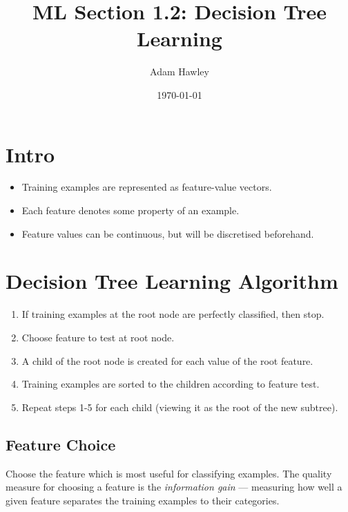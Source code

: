 \documentclass[11pt]{article}
\author{Adam Hawley}
\date{\today}
\title{ML Section 1.2: Decision Tree Learning}
\begin{document}
\maketitle
\tableofcontents


\section{Intro}
\label{sec:orgd5e139f}
\begin{itemize}
\item Training examples are represented as feature-value vectors.
\item Each feature denotes some property of an example.
\item Feature values can be continuous, but will be discretised beforehand.
\end{itemize}

\section{Decision Tree Learning Algorithm}
\label{sec:orgbc003dd}
\begin{enumerate}
\item If training examples at the root node are perfectly classified, then stop.
\item Choose feature to test at root node.
\item A child of the root node is created for each value of the root feature.
\item Training examples are sorted to the children according to feature test.
\item Repeat steps 1-5 for each child (viewing it as the root of the new subtree).
\end{enumerate}

\subsection{Feature Choice}
\label{sec:org3ff67e5}
Choose the feature which is most useful for classifying examples.
The quality measure for choosing a feature is the \emph{information gain} --- measuring how well a given feature separates the training examples to their categories.
\end{document}
